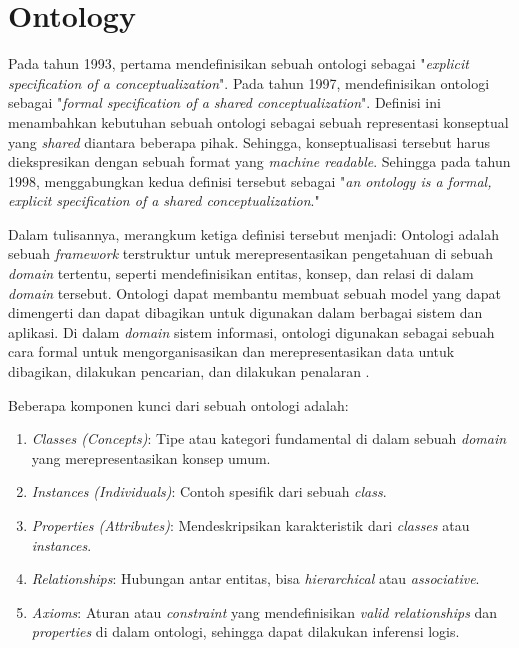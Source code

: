 \section{Ontology}
\label{sec:ontology}

Pada tahun 1993, \cite{gruber1993translation} pertama mendefinisikan sebuah ontologi sebagai "\textit{explicit specification of a conceptualization}". Pada tahun 1997, \cite{borst1997construction} mendefinisikan ontologi sebagai "\textit{formal specification of a shared conceptualization}". Definisi ini menambahkan kebutuhan sebuah ontologi sebagai sebuah representasi konseptual yang \textit{shared} diantara beberapa pihak. Sehingga, konseptualisasi tersebut harus diekspresikan dengan sebuah format yang \textit{machine readable}. Sehingga pada tahun 1998, \cite{studer1998knowledge} menggabungkan kedua definisi tersebut sebagai "\textit{an ontology is a formal, explicit specification of a shared conceptualization}."

Dalam tulisannya, \cite{Guarino2009} merangkum ketiga definisi tersebut menjadi: Ontologi adalah sebuah \textit{framework} terstruktur untuk merepresentasikan pengetahuan di sebuah \textit{domain} tertentu, seperti mendefinisikan entitas, konsep, dan relasi di dalam \textit{domain} tersebut. Ontologi dapat membantu membuat sebuah model yang dapat dimengerti dan dapat dibagikan untuk digunakan dalam berbagai sistem dan aplikasi. Di dalam \textit{domain} sistem informasi, ontologi digunakan sebagai sebuah cara formal untuk mengorganisasikan dan merepresentasikan data untuk dibagikan, dilakukan pencarian, dan dilakukan penalaran \parencite{Guarino2009}.

Beberapa komponen kunci dari sebuah ontologi adalah:

\begin{enumerate}
	\item \textit{Classes (Concepts)}: Tipe atau kategori fundamental di dalam sebuah \textit{domain} yang merepresentasikan konsep umum.
	\item \textit{Instances (Individuals)}: Contoh spesifik dari sebuah \textit{class}.
	\item \textit{Properties (Attributes)}: Mendeskripsikan karakteristik dari \textit{classes} atau \textit{instances}.
	\item \textit{Relationships}: Hubungan antar entitas, bisa \textit{hierarchical} atau \textit{associative}.
	\item \textit{Axioms}: Aturan atau \textit{constraint} yang mendefinisikan \textit{valid relationships} dan \textit{properties} di dalam ontologi, sehingga dapat dilakukan inferensi logis.
\end{enumerate}





